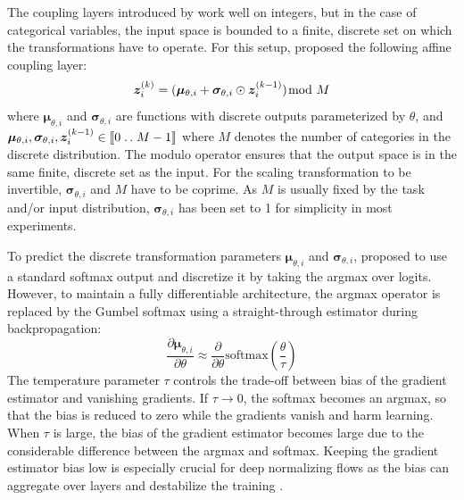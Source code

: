 The coupling layers introduced by \citet{IntegerNF} work well on integers, but in the case of categorical variables, the input space is bounded to a finite, discrete set on which the transformations have to operate. 
For this setup, \citet{TranDiscreteFlows} proposed the following affine coupling layer:
\begin{equation}
    \bm{z}^{(k)}_{i} = (\bm{\mu}_{\theta,i} + \bm{\sigma}_{\theta,i} \odot \bm{z}^{(k-1)}_i) \hspace{-2mm}\mod{M}
\end{equation}
where $\bm{\mu}_{\theta,i}$ and $\bm{\sigma}_{\theta,i}$ are functions with discrete outputs parameterized by $\theta$, and $\bm{\mu}_{\theta,i}, \bm{\sigma}_{\theta,i}, \bm{z}^{(k-1)}_{i} \in \llbracket0\mathrel{{.}\,{.}}\nobreak M-1\rrbracket$ where $M$ denotes the number of categories in the discrete distribution.
The modulo operator ensures that the output space is in the same finite, discrete set as the input. 
For the scaling transformation to be invertible, $\bm{\sigma}_{\theta,i}$ and $M$ have to be coprime. 
As $M$ is usually fixed by the task and/or input distribution, $\bm{\sigma}_{\theta,i}$ has been set to 1 for simplicity in most experiments. 

To predict the discrete transformation parameters $\bm{\mu}_{\theta,i}$ and $\bm{\sigma}_{\theta,i}$, \citet{TranDiscreteFlows} proposed to use a standard softmax output and discretize it by taking the argmax over logits. 
However, to maintain a fully differentiable architecture, the argmax operator is replaced by the Gumbel softmax \cite{GumbelSoftmax1, GumbelSoftmax2} using a straight-through estimator \cite{STEGradientEstimator} during backpropagation:
\begin{equation}
    \frac{\partial \bm{\mu}_{\theta,i}}{\partial \theta} \approx \frac{\partial}{\partial \theta} \text{softmax}\left(\frac{\theta}{\tau}\right)
\end{equation}
The temperature parameter $\tau$ controls the trade-off between bias of the gradient estimator and vanishing gradients. 
If $\tau\to 0$, the softmax becomes an argmax, so that the bias is reduced to zero while the gradients vanish and harm learning. 
When $\tau$ is large, the bias of the gradient estimator becomes large due to the considerable difference between the argmax and softmax. 
Keeping the gradient estimator bias low is especially crucial for deep normalizing flows as the bias can aggregate over layers and destabilize the training \cite{EmielDequantization}.

